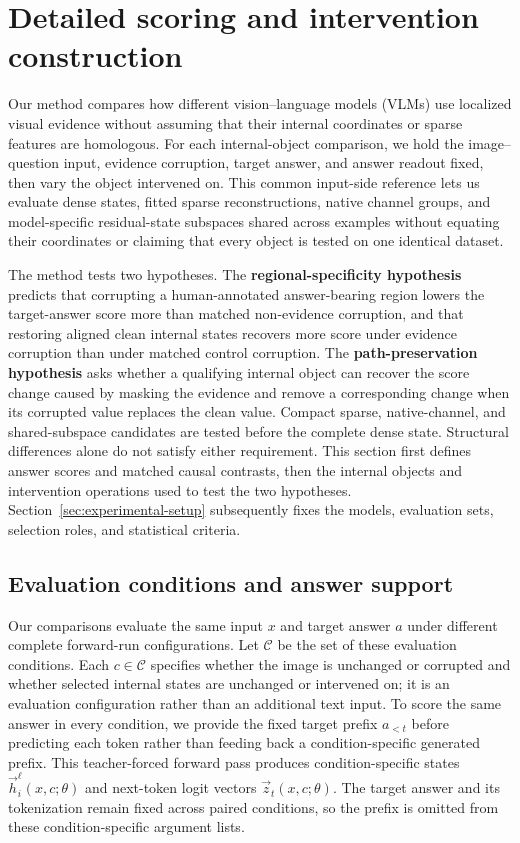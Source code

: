 \section{Detailed scoring and intervention construction}
\label{app:detailed-method}

Our method compares how different vision--language models (VLMs) use localized visual evidence without assuming that their internal coordinates or sparse features are homologous. For each internal-object comparison, we hold the image--question input, evidence corruption, target answer, and answer readout fixed, then vary the object intervened on. This common input-side reference lets us evaluate dense states, fitted sparse reconstructions, native channel groups, and model-specific residual-state subspaces shared across examples without equating their coordinates or claiming that every object is tested on one identical dataset.

The method tests two hypotheses. The \textbf{regional-specificity hypothesis} predicts that corrupting a human-annotated answer-bearing region lowers the target-answer score more than matched non-evidence corruption, and that restoring aligned clean internal states recovers more score under evidence corruption than under matched control corruption. The \textbf{path-preservation hypothesis} asks whether a qualifying internal object can recover the score change caused by masking the evidence and remove a corresponding change when its corrupted value replaces the clean value. Compact sparse, native-channel, and shared-subspace candidates are tested before the complete dense state. Structural differences alone do not satisfy either requirement. This section first defines answer scores and matched causal contrasts, then the internal objects and intervention operations used to test the two hypotheses. Section~\ref{sec:experimental-setup} subsequently fixes the models, evaluation sets, selection roles, and statistical criteria.

\subsection{Evaluation conditions and answer support}

Our comparisons evaluate the same input $x$ and target answer $a$ under different complete forward-run configurations. Let $\mathcal{C}$ be the set of these evaluation conditions. Each $c\in\mathcal{C}$ specifies whether the image is unchanged or corrupted and whether selected internal states are unchanged or intervened on; it is an evaluation configuration rather than an additional text input. To score the same answer in every condition, we provide the fixed target prefix $a_{<t}$ before predicting each token rather than feeding back a condition-specific generated prefix. This teacher-forced forward pass produces condition-specific states $\vec{h}_{i}^{\ell}(x,c;\theta)$ and next-token logit vectors $\vec{z}_{t}(x,c;\theta)$. The target answer and its tokenization remain fixed across paired conditions, so the prefix is omitted from these condition-specific argument lists.


